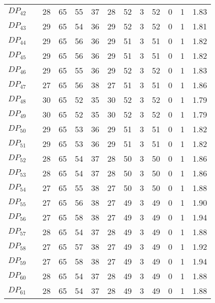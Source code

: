 \documentclass{article}
\begin{document}
\begin{center}
\begin{tabular}{llrrrrrrrrrrr}
$DP_{42}$ &  & 28 & 65 & 55 & 37 & 28 & 52 & 3 & 52 & 0 & 1 & 1.83 \\
$DP_{43}$ &  & 29 & 65 & 54 & 36 & 29 & 52 & 3 & 52 & 0 & 1 & 1.81 \\
$DP_{44}$ &  & 29 & 65 & 56 & 36 & 29 & 51 & 3 & 51 & 0 & 1 & 1.82 \\
$DP_{45}$ &  & 29 & 65 & 56 & 36 & 29 & 51 & 3 & 51 & 0 & 1 & 1.82 \\
$DP_{46}$ &  & 29 & 65 & 55 & 36 & 29 & 52 & 3 & 52 & 0 & 1 & 1.83 \\
$DP_{47}$ &  & 27 & 65 & 56 & 38 & 27 & 51 & 3 & 51 & 0 & 1 & 1.86 \\
$DP_{48}$ &  & 30 & 65 & 52 & 35 & 30 & 52 & 3 & 52 & 0 & 1 & 1.79 \\
$DP_{49}$ &  & 30 & 65 & 52 & 35 & 30 & 52 & 3 & 52 & 0 & 1 & 1.79 \\
$DP_{50}$ &  & 29 & 65 & 53 & 36 & 29 & 51 & 3 & 51 & 0 & 1 & 1.82 \\
$DP_{51}$ &  & 29 & 65 & 53 & 36 & 29 & 51 & 3 & 51 & 0 & 1 & 1.82 \\
$DP_{52}$ &  & 28 & 65 & 54 & 37 & 28 & 50 & 3 & 50 & 0 & 1 & 1.86 \\
$DP_{53}$ &  & 28 & 65 & 54 & 37 & 28 & 50 & 3 & 50 & 0 & 1 & 1.86 \\
$DP_{54}$ &  & 27 & 65 & 55 & 38 & 27 & 50 & 3 & 50 & 0 & 1 & 1.88 \\
$DP_{55}$ &  & 27 & 65 & 56 & 38 & 27 & 49 & 3 & 49 & 0 & 1 & 1.90 \\
$DP_{56}$ &  & 27 & 65 & 58 & 38 & 27 & 49 & 3 & 49 & 0 & 1 & 1.94 \\
$DP_{57}$ &  & 28 & 65 & 54 & 37 & 28 & 49 & 3 & 49 & 0 & 1 & 1.88 \\
$DP_{58}$ &  & 27 & 65 & 57 & 38 & 27 & 49 & 3 & 49 & 0 & 1 & 1.92 \\
$DP_{59}$ &  & 27 & 65 & 58 & 38 & 27 & 49 & 3 & 49 & 0 & 1 & 1.94 \\
$DP_{60}$ &  & 28 & 65 & 54 & 37 & 28 & 49 & 3 & 49 & 0 & 1 & 1.88 \\
$DP_{61}$ &  & 28 & 65 & 54 & 37 & 28 & 49 & 3 & 49 & 0 & 1 & 1.88 \\
\bottomrule
\end{tabular}


\end{center}
\end{document}
